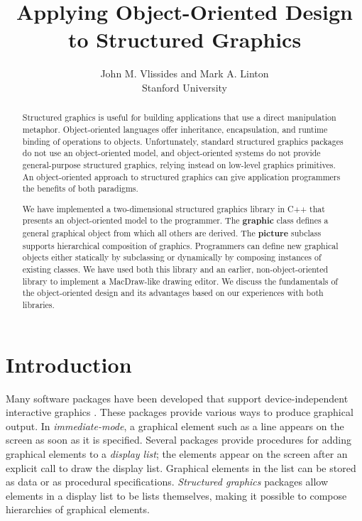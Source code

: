 
\title{ Applying Object-Oriented Design to Structured Graphics }
\author{
    John M. Vlissides and Mark A. Linton \\ 
    Stanford University
}



\maketitle
\thispagestyle{empty}


\begin{abstract}

Structured graphics is useful for building applications that use a direct
manipulation metaphor.  Object-oriented languages offer inheritance,
encapsulation, and runtime binding of operations to
objects.  Unfortunately, standard structured graphics packages do not use an
object-oriented model, and object-oriented systems do not provide
general-purpose structured graphics, relying instead on low-level
graphics primitives.  An object-oriented approach to structured graphics
can give application programmers the benefits of both paradigms.

We have implemented a two-dimensional structured graphics library in C++ that
presents an object-oriented model to the programmer.  The {\bf graphic}
class defines a general graphical object from which all others are derived.
The {\bf picture} subclass supports hierarchical composition of graphics.
Programmers can define new graphical objects either statically by
subclassing or dynamically by composing instances of existing classes.  We
have used both this library and an earlier, non-object-oriented library to
implement a MacDraw-like drawing editor.  We discuss the fundamentals of the
object-oriented design and its advantages based on our
experiences with both libraries.

\end{abstract}

\section{Introduction}

Many software packages have been developed that support
\mbox{device-independent} interactive graphics
\cite{iris:gl,gks,core,phigs,vgts}.  These packages provide various
ways to produce graphical output.  In {\em immediate-mode}, a graphical
element such as a line appears on the screen as soon as it is specified.
Several packages provide procedures for adding graphical elements to a {\em
display list}; the elements appear on the screen after an explicit call to
draw the display list.  Graphical elements in the list can be stored as data
or as procedural specifications.  {\em Structured graphics} packages allow
elements in a display list to be lists themselves, making it possible to
compose hierarchies of graphical elements.

